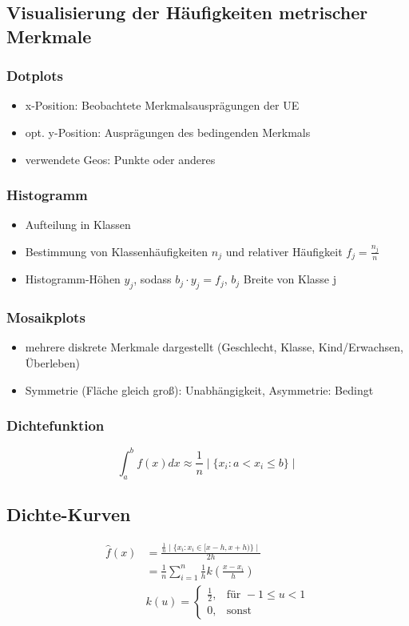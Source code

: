 \documentclass[10pt,a4paper,landscape]{article}
\begin{document}
\begin{multicols}{4}
\subsection{Visualisierung der Häufigkeiten metrischer Merkmale}
\subsubsection{Dotplots}
\begin{itemize}
\item x-Position: Beobachtete Merkmalsausprägungen der UE
\item opt. y-Position: Ausprägungen des bedingenden Merkmals
\item verwendete Geos: Punkte oder anderes
\end{itemize}

\subsubsection{Histogramm}
\begin{itemize}
\item Aufteilung in Klassen
\item Bestimmung von Klassenhäufigkeiten $n_j$ und relativer Häufigkeit $f_j=\frac{n_j}{n}$
\item Histogramm-Höhen $y_j$, sodass $b_j \cdot y_j = f_j$, $b_j$ Breite von Klasse j
\end{itemize}

\subsubsection{Mosaikplots}
\begin{itemize}
\item mehrere diskrete Merkmale dargestellt (Geschlecht, Klasse, Kind/Erwachsen, Überleben)
\item Symmetrie (Fläche gleich groß): Unabhängigkeit, Asymmetrie: Bedingt
\end{itemize}

\subsubsection{Dichtefunktion}
\[
\int_a ^b f(x)dx \approx \frac{1}{n}\mid \lbrace x_i : a < x_i \leqslant b\rbrace \mid
\]

\subsection{Dichte-Kurven}
\begin{align*}
\hat{f}(x) &= \frac{\frac{1}{n}\mid \lbrace x_i : x_i \in [x-h, x+h)\rbrace \mid}{2h} \\
		&= \frac{1}{n} \sum_{i = 1}^n \frac{1}{h}k\left(\frac{x-x_i}{h}\right) \\
		&k(u) = \begin{cases}
    \frac{1}{2}, & \text{für } -1 \leqslant u < 1 \\
    0, & \text{sonst} 
\end{cases}
\end{align*}


\end{multicols}
\end{document}

